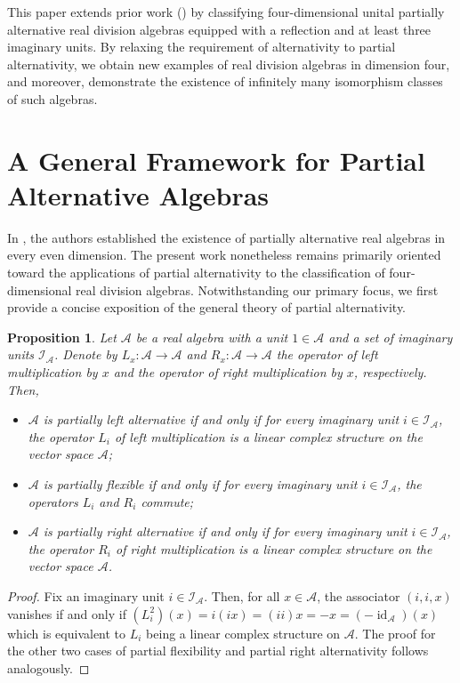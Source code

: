\documentclass{amsart}
\theoremstyle{definition}
\theoremstyle{plain}
\newtheorem{proposition}{Proposition}
\begin{document}
This paper extends prior work (\cite{HNT}) by classifying four-dimensional unital partially alternative real division algebras equipped with a reflection and at least three imaginary units. 
 By relaxing the requirement of alternativity to partial alternativity, we obtain new examples of real division algebras in dimension four, and moreover, demonstrate the existence of infinitely many isomorphism classes of such algebras.


\section{A General Framework for Partial Alternative Algebras}
In \cite{HNT}, the authors established the existence of partially alternative real algebras in every even dimension. The present work nonetheless remains primarily oriented toward the applications of partial alternativity to the classification of four-dimensional real division algebras. Notwithstanding our primary focus, we first provide a concise exposition of the general theory of partial alternativity.
\begin{proposition}
Let $\mathcal{A}$ be a real algebra with a unit $1\in\mathcal{A}$ and a set of imaginary units $\mathcal{I_A}$. Denote by $L_x:\mathcal{A}\rightarrow\mathcal{A}$ and $R_x:\mathcal{A}\rightarrow\mathcal{A}$ the operator of left multiplication by $x$ and the operator of right multiplication by $x$, respectively. Then,
\begin{itemize}
    \item[(1)] $\mathcal{A}$ is partially left alternative if and only if for every imaginary unit $i\in\mathcal{I_A}$, the operator $L_i$ of left multiplication is a linear complex structure on the vector space $\mathcal{A}$;
    \item[(2)] $\mathcal{A}$ is partially flexible if and only if for every imaginary unit $i\in\mathcal{I_A}$, the operators $L_i$ and $R_i$ commute;
    \item[(3)] $\mathcal{A}$ is partially right alternative if and only if for every imaginary unit $i\in\mathcal{I_A}$, the operator $R_i$ of right multiplication is a linear complex structure on the vector space $\mathcal{A}$.
\end{itemize}
\end{proposition}
\begin{proof}
Fix an imaginary unit $i\in\mathcal{I_A}$. Then, for all $x\in\mathcal{A}$, the associator $(i,i,x)$ vanishes if and only if $(L_i^2)(x)=i(ix)=(ii)x=-x=(-\operatorname{id}_\mathcal{A})(x)$ which is equivalent to $L_i$ being a linear complex structure on $\mathcal{A}$. The proof for the other two cases of partial flexibility and partial right alternativity follows analogously.
\end{proof}
\end{document}
